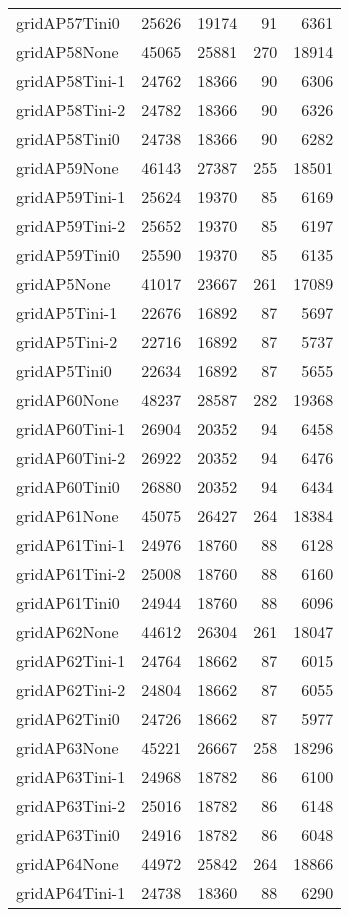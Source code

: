 \begin{longtable}{lrrrr}
gridAP57Tini0 & 25626 & 19174 & 91 & 6361 \\
gridAP58None & 45065 & 25881 & 270 & 18914 \\
gridAP58Tini-1 & 24762 & 18366 & 90 & 6306 \\
gridAP58Tini-2 & 24782 & 18366 & 90 & 6326 \\
gridAP58Tini0 & 24738 & 18366 & 90 & 6282 \\
gridAP59None & 46143 & 27387 & 255 & 18501 \\
gridAP59Tini-1 & 25624 & 19370 & 85 & 6169 \\
gridAP59Tini-2 & 25652 & 19370 & 85 & 6197 \\
gridAP59Tini0 & 25590 & 19370 & 85 & 6135 \\
gridAP5None & 41017 & 23667 & 261 & 17089 \\
gridAP5Tini-1 & 22676 & 16892 & 87 & 5697 \\
gridAP5Tini-2 & 22716 & 16892 & 87 & 5737 \\
gridAP5Tini0 & 22634 & 16892 & 87 & 5655 \\
gridAP60None & 48237 & 28587 & 282 & 19368 \\
gridAP60Tini-1 & 26904 & 20352 & 94 & 6458 \\
gridAP60Tini-2 & 26922 & 20352 & 94 & 6476 \\
gridAP60Tini0 & 26880 & 20352 & 94 & 6434 \\
gridAP61None & 45075 & 26427 & 264 & 18384 \\
gridAP61Tini-1 & 24976 & 18760 & 88 & 6128 \\
gridAP61Tini-2 & 25008 & 18760 & 88 & 6160 \\
gridAP61Tini0 & 24944 & 18760 & 88 & 6096 \\
gridAP62None & 44612 & 26304 & 261 & 18047 \\
gridAP62Tini-1 & 24764 & 18662 & 87 & 6015 \\
gridAP62Tini-2 & 24804 & 18662 & 87 & 6055 \\
gridAP62Tini0 & 24726 & 18662 & 87 & 5977 \\
gridAP63None & 45221 & 26667 & 258 & 18296 \\
gridAP63Tini-1 & 24968 & 18782 & 86 & 6100 \\
gridAP63Tini-2 & 25016 & 18782 & 86 & 6148 \\
gridAP63Tini0 & 24916 & 18782 & 86 & 6048 \\
gridAP64None & 44972 & 25842 & 264 & 18866 \\
gridAP64Tini-1 & 24738 & 18360 & 88 & 6290 \\

\end{longtable}
